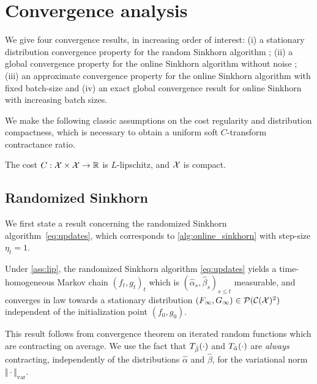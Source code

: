 

\section{Convergence analysis}\label{sec:analysis}

We give four convergence results, in increasing order of interest: (i) a stationary distribution
convergence property for the random Sinkhorn algorithm ; (ii) a global
convergence property for the online Sinkhorn algorithm without noise ; (iii) an
approximate convergence property for the online Sinkhorn algorithm with fixed
batch-size and (iv) an exact global convergence result for online Sinkhorn
with increasing batch sizes.

We make the following classic assumptions on the cost regularity and
distribution compactness, which is necessary to obtain a uniform
soft $C$-transform contractance ratio.

\begin{assumption}\label{ass:lip}
    The cost $C: \mathcal{X} \times \mathcal{X} \to \mathbb{R}$ is $L$-lipschitz, and $\mathcal{X}$ is  compact.
\end{assumption}

\subsection{Randomized Sinkhorn}

We first state a result concerning the randomized Sinkhorn algorithm~\eqref{eq:updates}, which corresponds to
\autoref{alg:online_sinkhorn} with step-size $\eta_t = 1$.

\begin{proposition}\label{prop:markov}
    Under \autoref{ass:lip}, the randomized Sinkhorn algorithm \eqref{eq:updates} yields a time-homogeneous
    Markov chain ${(f_t, g_t)}_t$ which is $(\hat \alpha_s, \hat \beta_s)_{s \leq
    t}$ measurable, and converges in law towards a stationary distribution
    $(F_\infty, G_\infty) \in \mathcal{P}(\mathcal{C}(\mathcal{X})^2)$ independent of the initialization
    point $(f_0, g_0)$.
\end{proposition}

This result follows from \citet{diaconis_iterated} convergence theorem on
iterated random functions which are contracting on average. We use the
fact that $T_{\hat \beta}(\cdot)$ and $T_{\hat \alpha}(\cdot)$ are
\textit{always} contracting, independently of the distributions $\hat \alpha$ and
$\hat \beta$, for the variational norm $\Vert \cdot \Vert_{\text{var}}$.

